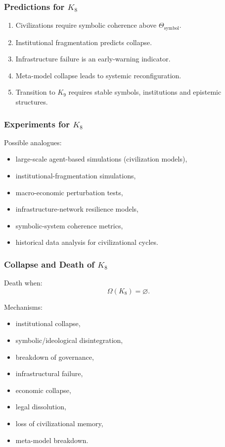 \subsubsection{Predictions for \texorpdfstring{$K_8$}{K_8}}

\begin{enumerate}
    \item Civilizations require symbolic coherence above $\Theta_{\mathrm{symbol}}$.
    \item Institutional fragmentation predicts collapse.
    \item Infrastructure failure is an early-warning indicator.
    \item Meta-model collapse leads to systemic reconfiguration.
    \item Transition to $K_9$ requires stable symbols, institutions and epistemic structures.
\end{enumerate}

\subsubsection{Experiments for \texorpdfstring{$K_8$}{K_8}}

Possible analogues:
\begin{itemize}
    \item large-scale agent-based simulations (civilization models),
    \item institutional-fragmentation simulations,
    \item macro-economic perturbation tests,
    \item infrastructure-network resilience models,
    \item symbolic-system coherence metrics,
    \item historical data analysis for civilizational cycles.
\end{itemize}

\subsubsection{Collapse and Death of \texorpdfstring{$K_8$}{K_8}}

Death when:
\[
\Omega(K_8)=\varnothing.
\]

Mechanisms:
\begin{itemize}
    \item institutional collapse,
    \item symbolic/ideological disintegration,
    \item breakdown of governance,
    \item infrastructural failure,
    \item economic collapse,
    \item legal dissolution,
    \item loss of civilizational memory,
    \item meta-model breakdown.
\end{itemize}

